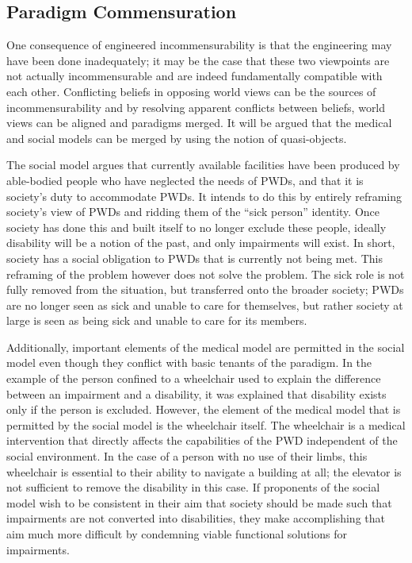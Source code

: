 \documentclass[a4paper]{article}
\begin{document}
\subsection{Paradigm Commensuration}

One consequence of engineered incommensurability is that the engineering may
have been done inadequately; it may be the case that these two viewpoints are
not actually incommensurable and are indeed fundamentally compatible with each
other. Conflicting beliefs in opposing world views can be the sources of
incommensurability and by resolving apparent conflicts between beliefs, world
views can be aligned and paradigms merged. It will be argued that the medical
and social models can be merged by using the notion of quasi-objects.

The social model argues that currently available facilities have been produced
by able-bodied people who have neglected the needs of PWDs, and that it is
society's duty to accommodate PWDs. It intends to do this by entirely
reframing society's view of PWDs and ridding them of the ``sick person''
identity. Once society has done this and built itself to no longer exclude
these people, ideally disability will be a notion of the past, and only
impairments will exist. In short, society has a social obligation to PWDs that
is currently not being met. This reframing of the problem however does not
solve the problem. The sick role is not fully removed from the situation, but
transferred onto the broader society; PWDs are no longer seen as sick and
unable to care for themselves, but rather society at large is seen as being
sick and unable to care for its members.

Additionally, important elements of the medical model are permitted in the
social model even though they conflict with basic tenants of the paradigm. In
the example of the person confined to a wheelchair used to explain the
difference between an impairment and a disability, it was explained that
disability exists only if the person is excluded. However, the element of the
medical model that is permitted by the social model is the wheelchair itself.
The wheelchair is a medical intervention that directly affects the
capabilities of the PWD independent of the social environment. In the case of
a person with no use of their limbs, this wheelchair is essential to their
ability to navigate a building at all; the elevator is not sufficient to
remove the disability in this case. If proponents of the social model wish to
be consistent in their aim that society should be made such that impairments
are not converted into disabilities, they make accomplishing that aim much
more difficult by condemning viable functional solutions for impairments.
\end{document}
